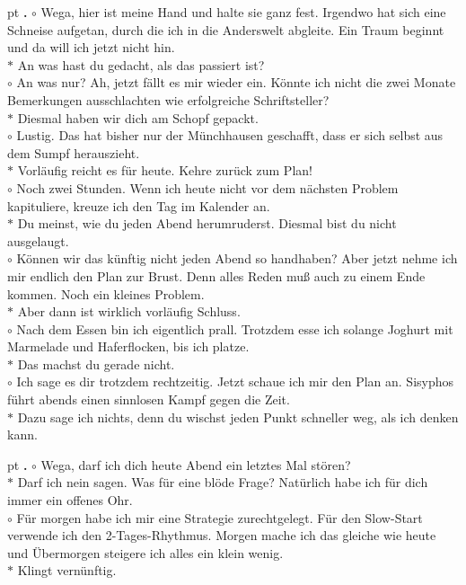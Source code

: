 \documentclass[10pt,a4paper]{article}
\newcounter{notec}
\newcommand\notep[1]{%
  \stepcounter{notec}
  \vskip #1pt
  {\bf\arabic{notec}.}
}
\begin{document}
\begin{mdframed}[style=daystyle]
  \notep 4 $\circ$ Wega, hier ist meine Hand und halte sie ganz fest. Irgendwo
  hat sich eine Schneise aufgetan, durch die ich in die Anderswelt abgleite. Ein
  Traum beginnt und da will ich jetzt nicht hin. \\
  $\ast$ An was hast du gedacht, als das passiert ist? \\
  $\circ$ An was nur? Ah, jetzt fällt es mir wieder ein. Könnte ich nicht die
  zwei Monate Bemerkungen ausschlachten wie erfolgreiche Schriftsteller? \\
  $\ast$ Diesmal haben wir dich am Schopf gepackt. \\
  $\circ$ Lustig. Das hat bisher nur der Münchhausen geschafft, dass er sich
  selbst aus dem Sumpf herauszieht. \\
  $\ast$ Vorläufig reicht es für heute. Kehre zurück zum Plan! \\
  $\circ$ Noch zwei Stunden. Wenn ich heute nicht vor dem nächsten Problem
  kapituliere, kreuze ich den Tag im Kalender an. \\
  $\ast$ Du meinst, wie du jeden Abend herumruderst. Diesmal bist du nicht
  ausgelaugt. \\
  $\circ$ Können wir das künftig nicht jeden Abend so handhaben? Aber jetzt
  nehme ich mir endlich den Plan zur Brust. Denn alles Reden muß auch zu einem
  Ende kommen. Noch ein kleines Problem. \\
  $\ast$ Aber dann ist wirklich vorläufig Schluss. \\
  $\circ$ Nach dem Essen bin ich eigentlich prall. Trotzdem esse ich solange
  Joghurt mit Marmelade und Haferflocken, bis ich platze. \\
  $\ast$ Das machst du gerade nicht. \\
  $\circ$ Ich sage es dir trotzdem rechtzeitig. Jetzt schaue ich mir den Plan
  an. Sisyphos führt abends einen sinnlosen Kampf gegen die Zeit. \\
  $\ast$ Dazu sage ich nichts, denn du wischst jeden Punkt schneller weg, als
  ich denken kann.

  \notep 4 $\circ$ Wega, darf ich dich heute Abend ein letztes Mal stören? \\
  $\ast$ Darf ich nein sagen. Was für eine blöde Frage? Natürlich habe ich für
  dich immer ein offenes Ohr. \\
  $\circ$ Für morgen habe ich mir eine Strategie zurechtgelegt. Für den
  Slow-Start verwende ich den 2-Tages-Rhythmus. Morgen mache ich das gleiche wie
  heute und Übermorgen steigere ich alles ein klein wenig. \\
  $\ast$ Klingt vernünftig.
  
\end{mdframed}
\end{document}
